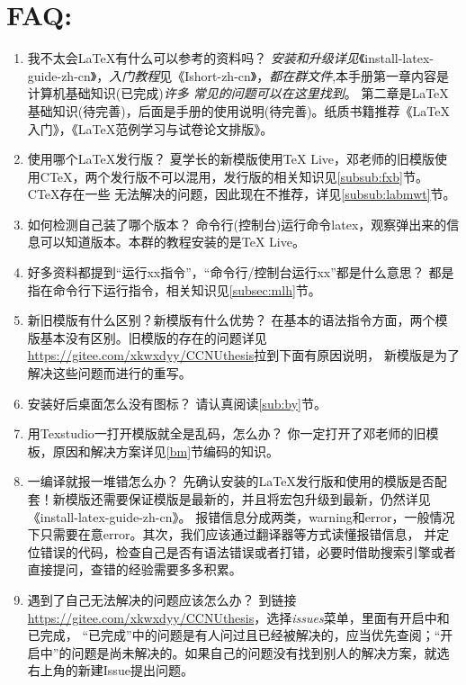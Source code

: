 \section*{FAQ:}
\begin{enumerate}
  \item 我不太会\LaTeX{}有什么可以参考的资料吗？\,\,\emph{安装和升级详见}《install-latex-guide-zh-cn》，\emph{入门教程}见《Ishort-zh-cn》，\emph{都在群文件},本手册第一章内容是计算机基础知识(已完成)\emph{许多
  常见的问题可以在这里找到}。
  第二章是\LaTeX{}基础知识(待完善)，后面是手册的使用说明(待完善)。纸质书籍推荐《LaTeX入门》，《LaTeX范例学习与试卷论文排版》。
  \item 使用哪个\LaTeX{}发行版？\,\,夏学长的新模版使用\TeX{} Live，邓老师的旧模版使用C\TeX{}，两个发行版不可以混用，发行版的相关知识见\ref{subsub:fxb}节。C\TeX{}存在一些
        无法解决的问题，因此现在不推荐，详见\ref{subsub:labmwt}节。
  \item 如何检测自己装了哪个版本？\,\,命令行(控制台)运行命令latex，观察弹出来的信息可以知道版本。本群的教程安装的是\TeX{} Live。
  \item 好多资料都提到“运行xx指令”，“命令行/控制台运行xx”都是什么意思？\,\,都是指在命令行下运行指令，相关知识见\ref{subsec:mlh}节。
  \item 新旧模版有什么区别？新模版有什么优势？\,\,在基本的语法指令方面，两个模版基本没有区别。旧模版的存在的问题详见\url{https://gitee.com/xkwxdyy/CCNUthesis}拉到下面有原因说明，
        新模版是为了解决这些问题而进行的重写。
  \item 安装好后桌面怎么没有图标？\,\,请认真阅读\ref{sub:by}节。
  \item 用Texstudio一打开模版就全是乱码，怎么办？\,\,你一定打开了邓老师的旧模板，原因和解决方案详见\ref{bm}节编码的知识。
  \item 一编译就报一堆错怎么办？\,\,先确认安装的\LaTeX{}发行版和使用的模版是否配套！新模版还需要保证模版是最新的，并且将宏包升级到最新，仍然详见《install-latex-guide-zh-cn》。
  报错信息分成两类，warning和error，一般情况下只需要在意error。其次，我们应该通过翻译器等方式读懂报错信息，
       并定位错误的代码，检查自己是否有语法错误或者打错，必要时借助搜索引擎或者直接提问，查错的经验需要多多积累。
  \item 遇到了自己无法解决的问题应该怎么办？\,\,到链接\url{https://gitee.com/xkwxdyy/CCNUthesis}，选择\emph{issues}菜单，里面有开启中和已完成，
        “已完成”中的问题是有人问过且已经被解决的，应当优先查阅；“开启中”的问题是尚未解决的。如果自己的问题没有找到别人的解决方案，就选右上角的新建Issue提出问题。
  
 
\end{enumerate}

